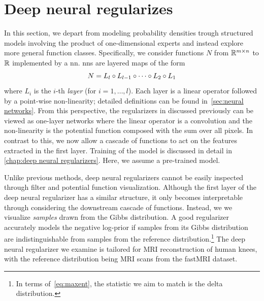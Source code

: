 \section{Deep neural regularizes}%
\label{sec:regularizers deep neural regularizers}
In this section, we depart from modeling probability densities trough structured models involving the product of one-dimensional experts and instead explore more general function classes.
Specifically, we consider functions \( N \) from \( \mathbb{R}^{m\times n} \) to \( \mathbb{R} \) implemented by a \gls{nn}.
\Glspl{nn} are layered maps of the form
\begin{equation}
	N = L_l \circ L_{l-\num{1}} \circ \cdots \circ L_{\num{2}} \circ L_{\num{1}}
\end{equation}
where \( L_i \) is the \( i \)-th \emph{layer} (for \( i = \num{1}, \dotsc, l \)).
Each layer is a linear operator followed by a point-wise non-linearity;
detailed definitions can be found in~\cref{sec:neural networks}.
From this perspective, the regularizers in discussed previously can be viewed as one-layer networks where the linear operator is a convolution and the non-linearity is the potential function composed with the sum over all pixels.
In contrast to this, we now allow a cascade of functions to act on the features extracted in the first layer.
Training of the model is discussed in detail in \cref{chap:deep neural regularizers}.
Here, we assume a pre-trained model.

Unlike previous methods, deep neural regularizers cannot be easily inspected through filter and potential function visualization.
Although the first layer of the deep neural regularizer has a similar structure, it only becomes interpretable through considering the downstream cascade of functions.
Instead, we we visualize \emph{samples} drawn from the Gibbs distribution.
A good regularizer accurately models the negative log-prior if samples from its Gibbs distribution are indistinguishable from samples from the reference distribution.\footnote{
	In terms of~\cref{eq:maxent}, the statistic we aim to match is the delta distribution.
}
The deep neural regularizer we examine is tailored for MRI reconstruction of human knees, with the reference distribution being MRI scans from the fastMRI dataset.

